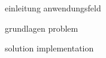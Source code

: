 \begin{comment}
Guidelines:
Seiten: 50
Präsentation: 30 min / Disskusion: 15 min
sonarqube als code scan (nur ein vorschlag)
\end{comment}

{einleitung}
{anwendungsfeld}

{grundlagen}
{problem}

\begin{comment}
diese lösen das problem der teuren clients ABER clients müssen dann möglichst optimal auf die broker verteilt werden
-> load balancer

iot mqtt threat model ? maybe show this ?

- If your work is based on preliminary work, then outline this preliminary work: "The de-ployment into production is itself semi-automatic. In a continuous integration pipeline..."
- Do some research forrelated work, e.g., commercial products, research prototypes or con-ceptual research that have the same or similar objectives like your work. Compare and de-lineate your work with/from the related work.
- Keep an eye on the proper citation of the works you are describing
- Conclude this chapter with some insufficiencies or shortcomings of the preliminary or related work. This should motivate the necessity of your work.
\end{comment}

{solution}
{implementation}


\begin{comment}
- In the initiation phase, we agree on work packages. Give a (tabular overview) of which work packages have been finalized
  - to what degree
  - and in which time frame
- Please described the unforeseen difficulties that resulted in unfinished or abandoned work packages
\end{comment}

